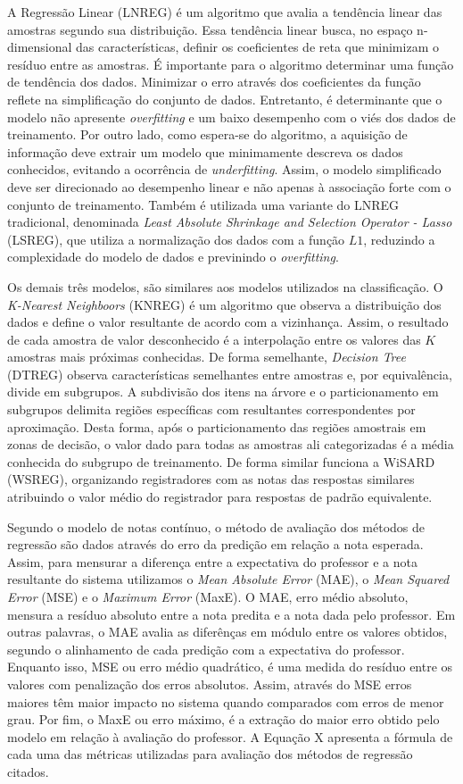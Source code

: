A Regressão Linear (LNREG) é um algoritmo que avalia a tendência linear das amostras segundo sua distribuição. Essa tendência linear busca, no espaço n-dimensional das características, definir os coeficientes de reta que minimizam o resíduo entre as amostras. É importante para o algoritmo determinar uma função de tendência dos dados. Minimizar o erro através dos coeficientes da função reflete na simplificação do conjunto de dados. Entretanto, é determinante que o modelo não apresente \textit{overfitting} e um baixo desempenho com o viés dos dados de treinamento. Por outro lado, como espera-se do algoritmo, a aquisição de informação deve extrair um modelo que minimamente descreva os dados conhecidos, evitando a ocorrência de \textit{underfitting}. Assim, o modelo simplificado deve ser direcionado ao desempenho linear e não apenas à associação forte com o conjunto de treinamento. Também é utilizada uma variante do LNREG tradicional, denominada \textit{Least Absolute Shrinkage and Selection Operator - Lasso} (LSREG), que utiliza a normalização dos dados com a função $ L1 $, reduzindo a complexidade do modelo de dados e previnindo o \textit{overfitting}.

Os demais três modelos, são similares aos modelos utilizados na classificação. O \textit{K-Nearest Neighboors} (KNREG) é um algoritmo que observa a distribuição dos dados e define o valor resultante de acordo com a vizinhança. Assim, o resultado de cada amostra de valor desconhecido é a interpolação entre os valores das $ K $ amostras mais próximas conhecidas. De forma semelhante, \textit{Decision Tree} (DTREG) observa características semelhantes entre amostras e, por equivalência, divide em subgrupos. A subdivisão dos itens na árvore e o particionamento em subgrupos delimita regiões específicas com resultantes correspondentes por aproximação. Desta forma, após o particionamento das regiões amostrais em zonas de decisão, o valor dado para todas as amostras ali categorizadas é a média conhecida do subgrupo de treinamento. De forma similar funciona a WiSARD (WSREG), organizando registradores com as notas das respostas similares atribuindo o valor médio do registrador para respostas de padrão equivalente.

Segundo o modelo de notas contínuo, o método de avaliação dos métodos de regressão são dados através do erro da predição em relação a nota esperada. Assim, para mensurar a diferença entre a expectativa do professor e a nota resultante do sistema utilizamos o \textit{Mean Absolute Error} (MAE), o \textit{Mean Squared Error} (MSE) e o \textit{Maximum Error} (MaxE). O MAE, erro médio absoluto, mensura a resíduo absoluto entre a nota predita e a nota dada pelo professor. Em outras palavras, o MAE avalia as diferênças em módulo entre os valores obtidos, segundo o alinhamento de cada predição com a expectativa do professor. Enquanto isso, MSE ou erro médio quadrático, é uma medida do resíduo entre os valores com penalização dos erros absolutos. Assim, através do MSE erros maiores têm maior impacto no sistema quando comparados com erros de menor grau. Por fim, o MaxE ou erro máximo, é a extração do maior erro obtido pelo modelo em relação à avaliação do professor. A Equação X apresenta a fórmula de cada uma das métricas utilizadas para avaliação dos métodos de regressão citados.

